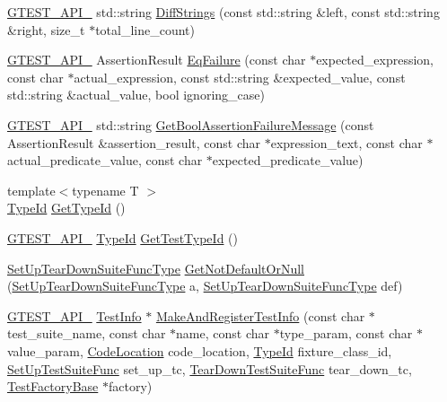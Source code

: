 \begin{DoxyCompactItemize}
\hyperlink{gtest-port_8h_aa73be6f0ba4a7456180a94904ce17790}{G\+T\+E\+S\+T\+\_\+\+A\+P\+I\+\_\+} std\+::string \hyperlink{namespacetesting_1_1internal_a513107ff8defa97d949937fc1350a56c}{Diff\+Strings} (const std\+::string \&left, const std\+::string \&right, size\+\_\+t $\ast$total\+\_\+line\+\_\+count)
\item 
\hyperlink{gtest-port_8h_aa73be6f0ba4a7456180a94904ce17790}{G\+T\+E\+S\+T\+\_\+\+A\+P\+I\+\_\+} Assertion\+Result \hyperlink{namespacetesting_1_1internal_ac61e2ba2cbf259fd6ee5ffd4e49c9445}{Eq\+Failure} (const char $\ast$expected\+\_\+expression, const char $\ast$actual\+\_\+expression, const std\+::string \&expected\+\_\+value, const std\+::string \&actual\+\_\+value, bool ignoring\+\_\+case)
\item 
\hyperlink{gtest-port_8h_aa73be6f0ba4a7456180a94904ce17790}{G\+T\+E\+S\+T\+\_\+\+A\+P\+I\+\_\+} std\+::string \hyperlink{namespacetesting_1_1internal_aed8d3ad4341f8f2de53440e39c995632}{Get\+Bool\+Assertion\+Failure\+Message} (const Assertion\+Result \&assertion\+\_\+result, const char $\ast$expression\+\_\+text, const char $\ast$actual\+\_\+predicate\+\_\+value, const char $\ast$expected\+\_\+predicate\+\_\+value)
\item 
{\footnotesize template$<$typename T $>$ }\\\hyperlink{namespacetesting_1_1internal_ab1114197d3c657d8b7f8e0c5caa12d00}{Type\+Id} \hyperlink{namespacetesting_1_1internal_a6b108e56fdc68ea937ffb3759fb55ab0}{Get\+Type\+Id} ()
\item 
\hyperlink{gtest-port_8h_aa73be6f0ba4a7456180a94904ce17790}{G\+T\+E\+S\+T\+\_\+\+A\+P\+I\+\_\+} \hyperlink{namespacetesting_1_1internal_ab1114197d3c657d8b7f8e0c5caa12d00}{Type\+Id} \hyperlink{namespacetesting_1_1internal_a1e85cf16bb95b60f879d48ba1fbfc1c9}{Get\+Test\+Type\+Id} ()
\item 
\hyperlink{namespacetesting_1_1internal_a04786aa10f8b0bf38a5ead94d00475f4}{Set\+Up\+Tear\+Down\+Suite\+Func\+Type} \hyperlink{namespacetesting_1_1internal_a9579a78c229ea302caded45d65f77336}{Get\+Not\+Default\+Or\+Null} (\hyperlink{namespacetesting_1_1internal_a04786aa10f8b0bf38a5ead94d00475f4}{Set\+Up\+Tear\+Down\+Suite\+Func\+Type} a, \hyperlink{namespacetesting_1_1internal_a04786aa10f8b0bf38a5ead94d00475f4}{Set\+Up\+Tear\+Down\+Suite\+Func\+Type} def)
\item 
\hyperlink{gtest-port_8h_aa73be6f0ba4a7456180a94904ce17790}{G\+T\+E\+S\+T\+\_\+\+A\+P\+I\+\_\+} \hyperlink{classtesting_1_1TestInfo}{Test\+Info} $\ast$ \hyperlink{namespacetesting_1_1internal_a7ab4072540184e26119ad853f45059f7}{Make\+And\+Register\+Test\+Info} (const char $\ast$test\+\_\+suite\+\_\+name, const char $\ast$name, const char $\ast$type\+\_\+param, const char $\ast$value\+\_\+param, \hyperlink{structtesting_1_1internal_1_1CodeLocation}{Code\+Location} code\+\_\+location, \hyperlink{namespacetesting_1_1internal_ab1114197d3c657d8b7f8e0c5caa12d00}{Type\+Id} fixture\+\_\+class\+\_\+id, \hyperlink{namespacetesting_1_1internal_a83e4e0732ac6a9dcfe6ee299dc1b9fa2}{Set\+Up\+Test\+Suite\+Func} set\+\_\+up\+\_\+tc, \hyperlink{namespacetesting_1_1internal_a8257a87aa42cebaa54b0c48a6ae657a5}{Tear\+Down\+Test\+Suite\+Func} tear\+\_\+down\+\_\+tc, \hyperlink{classtesting_1_1internal_1_1TestFactoryBase}{Test\+Factory\+Base} $\ast$factory)

\end{DoxyCompactItemize}
